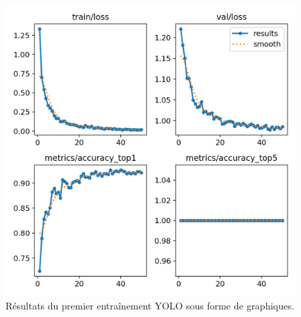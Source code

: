 \begin{figure}[!h]
	\begin{center}
		\includegraphics[width=12cm]{../images/YOLO_result50epoch.png}
		\caption{Résultats du premier entraînement YOLO sous forme de graphiques.}
	 \end{center}
\end{figure}
 
